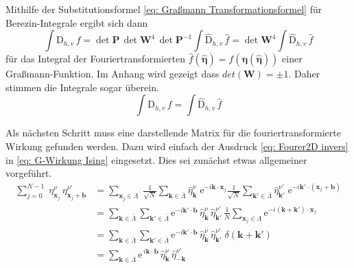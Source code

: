 \noindent Mithilfe der Substitutionsformel \eqref{eq: Graßmann Transformationsformel} für Berezin-Integrale ergibt sich dann 
\begin{equation} \label{eq: FT Integral wd}
 \int {\mathrm{D}}_{h,v} \, f  = \det{\bm{P}}\,\det{\bm{W}}^4\, \det{\bm{P}^{-1}} \int \hat{\mathrm{D}}_{h,v} \, \hat{f}  =  \det{\bm{W}}^4 \int \hat{\mathrm{D}}_{h,v} \, \hat{f}
\end{equation} 
für das Integral der Fouriertransformierten $\hat{f}(\bm{\hat{\eta}}) = f(\bm{\eta}(\bm{\hat{\eta}}))$ einer Graßmann-Funktion. Im Anhang wird gezeigt dass $det(\bm{W}) = \pm 1$. Daher stimmen die Integrale sogar überein.  
\begin{equation} \label{eq: FT Integral}
 \int \mathrm{D}_{h,v} \, f  = \int \hat{\mathrm{D}}_{h,v} \, \hat{f}
\end{equation}

\noindent Als nächsten Schritt muss eine darstellende Matrix für die fouriertransformierte Wirkung gefunden werden. Dazu wird einfach der Ausdruck  \eqref{eq: Fourer2D invers} in \eqref{eq: G-Wirkung Ising} eingesetzt. Dies sei zunächst etwas allgemeiner vorgeführt.
\begin{align}
\sum_{j = 0}^{N-1} \; \eta^{\nu}_{\bm{x}_j} \,\eta^{\nu'}_{\bm{x}_j+\bm{b}}
& = \sum_{\bm{x}_j \in \Lambda} \; \frac{1}{\sqrt{N}} \sum_{\bm{k} \in \bar{\Lambda}} \hat{\eta}_{\bm{k}}^{\nu}\; \mathrm{e}^{-i \bm{k} \cdot \bm{x}_j} \frac{1}{\sqrt{N}} \sum_{\bm{k'} \in \bar{\Lambda}} \hat{\eta}_{\bm{k'}}^{\nu'}\; \mathrm{e}^{-i  \bm{k'} \cdot (\bm{x}_j+\bm{b})} \nonumber \\
&  = \sum_{\bm{k} \in \bar{\Lambda}} \sum_{\bm{k'} \in \bar{\Lambda}} \mathrm{e}^{-i  \bm{k'} \cdot \bm{b}} \, \hat{\eta}_{\bm{k}}^{\nu}\, \hat{\eta}_{\bm{k'}}^{\nu'} \, \frac{1}{N} \sum_{\bm{x}_j \in \Lambda} \mathrm{e}^{-i (\bm{k} + \bm{k'})\cdot \bm{x}_j } \nonumber \\ 
&  = \sum_{\bm{k} \in \bar{\Lambda}} \sum_{\bm{k'} \in \bar{\Lambda}} \mathrm{e}^{-i  \bm{k'} \cdot \bm{b}} \, \hat{\eta}_{\bm{k}}^{\nu} \, \hat{\eta}_{\bm{k'}}^{\nu'} \; \delta(\bm{k} + \bm{k'}) \nonumber \\
& = \sum_{\bm{k} \in \bar{\Lambda}}  \mathrm{e}^{\,i  \bm{k} \cdot \bm{b}} \,\hat{\eta}_{\bm{k}}^{\nu}\, \hat{\eta}_{-\bm{k}}^{\nu'} \nonumber
\end{align}\\

